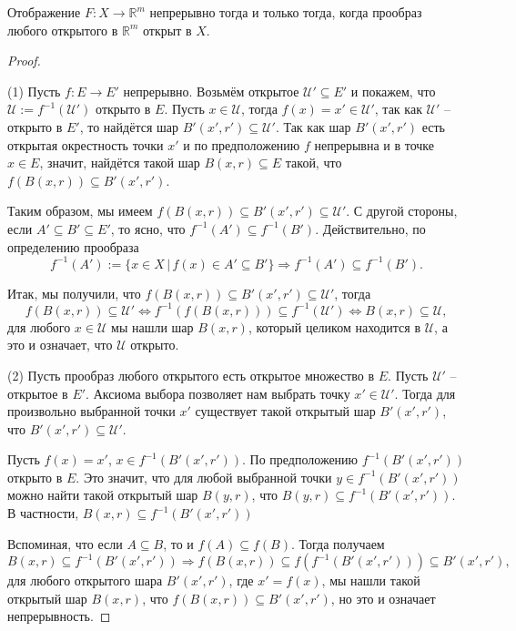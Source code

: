 \begin{theorem}\label{preimage_of_open}
 Отображение $F:X \to \mathbb{R}^m$ непрерывно тогда и только тогда, когда прообраз любого открытого в $\mathbb{R}^m$ открыт в $X.$
\end{theorem}
\begin{proof}~

(1) Пусть $f:E \to E'$ непрерывно. Возьмём открытое $\mathscr{U}' \subseteq E'$ и покажем, что $\mathscr{U}:=f^{-1}(\mathscr{U'})$ открыто в $E$. Пусть $x \in \mathscr{U}$, тогда $f(x) = x' \in \mathscr{U}'$, так как $\mathscr{U}'$ -- открыто в $E'$, то найдётся шар $B'(x',r') \subseteq \mathscr{U}'$. Так как шар $B'(x',r')$ есть открытая окрестность точки $x'$ и по предположению $f$ непрерывна и в точке $x \in E$, значит, найдётся такой шар $B(x,r) \subseteq E$ такой, что $f(B(x,r)) \subseteq B'(x',r')$. 

Таким образом, мы имеем $f(B(x,r)) \subseteq B'(x',r') \subseteq \mathscr{U}' .$ С другой стороны, если $A'\subseteq B' \subseteq E'$, то ясно, что $f^{-1}(A') \subseteq f^{-1}(B')$. Действительно, по определению прообраза
    \[
     f^{-1}(A'):= \{x \in X\, |\, f(x) \in A' \subseteq B'\} \Longrightarrow f^{-1}(A') \subseteq f^{-1}(B').
    \]

 Итак, мы получили, что $f(B(x,r)) \subseteq B'(x',r') \subseteq \mathscr{U}'$, тогда
 \[
  f(B(x,r)) \subseteq \mathscr{U}' \Longleftrightarrow f^{-1}(f(B(x,r))) \subseteq f^{-1}(\mathscr{U}')  \Longleftrightarrow B(x,r) \subseteq \mathscr{U},
 \]
 \ie для любого $x \in \mathscr{U}$ мы нашли шар $B(x,r)$, который целиком находится в $\mathscr{U}$, а это и означает, что $\mathscr{U}$ открыто.

(2) Пусть прообраз любого открытого есть открытое множество в $E.$ Пусть $\mathscr{U}'$ -- открытое в $E'$. Аксиома выбора позволяет нам выбрать точку $x' \in \mathscr{U}'$. Тогда для произвольно выбранной точки $x'$ существует такой открытый шар $B'(x',r')$, что $B'(x',r') \subseteq \mathscr{U}'.$

Пусть $f(x) = x'$, \ie $x \in f^{-1}(B'(x',r'))$. По предположению $f^{-1}(B'(x',r'))$ открыто в $E$. Это значит, что для любой выбранной точки $y \in f^{-1}(B'(x',r'))$ можно найти такой открытый шар $B(y,r)$, что $B(y,r) \subseteq f^{-1}(B'(x',r'))$. В частности, $B(x,r) \subseteq f^{-1}(B'(x',r'))$ 

Вспоминая, что если $A \subseteq B$, то и $f(A) \subseteq f(B)$. Тогда получаем 
\[
  B(x,r) \subseteq f^{-1}(B'(x',r')) \Longrightarrow f(B(x,r)) \subseteq f(f^{-1}(B'(x',r'))) \subseteq B'(x',r'),
\]
\ie для любого открытого шара $B'(x',r')$, где $x' = f(x)$, мы нашли такой открытый шар $B(x,r)$, что $f(B(x,r)) \subseteq B'(x',r')$, но это и означает непрерывность.
\end{proof}


